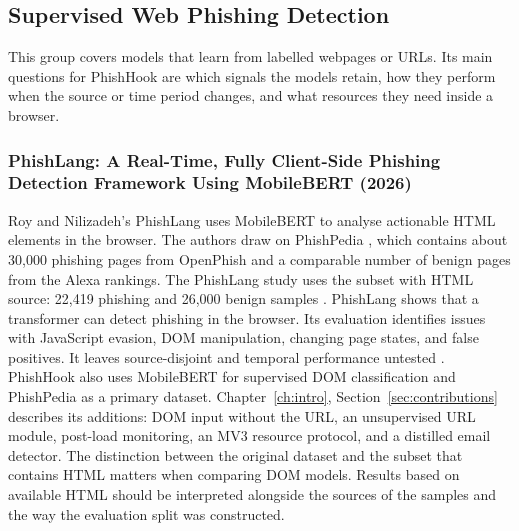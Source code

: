 \documentclass{FastFyp}
\begin{document}
\subsection{Supervised Web Phishing Detection}
This group covers models that learn from labelled webpages or URLs. Its main questions for PhishHook are which signals the models retain, how they perform when the source or time period changes, and what resources they need inside a browser.

\subsubsection{PhishLang: A Real-Time, Fully Client-Side Phishing Detection Framework Using MobileBERT (2026)}
Roy and Nilizadeh's PhishLang uses MobileBERT to analyse actionable HTML elements in the browser. The authors draw on PhishPedia \cite{phishpedia2021}, which contains about 30,000 phishing pages from OpenPhish and a comparable number of benign pages from the Alexa rankings. The PhishLang study uses the subset with HTML source: 22,419 phishing and 26,000 benign samples \cite{phishlang2026}. PhishLang shows that a transformer can detect phishing in the browser. Its evaluation identifies issues with JavaScript evasion, DOM manipulation, changing page states, and false positives. It leaves source-disjoint and temporal performance untested \cite{phishlang2026}. PhishHook also uses MobileBERT for supervised DOM classification and PhishPedia as a primary dataset. Chapter~\ref{ch:intro}, Section~\ref{sec:contributions} describes its additions: DOM input without the URL, an unsupervised URL module, post-load monitoring, an MV3 resource protocol, and a distilled email detector. The distinction between the original dataset and the subset that contains HTML matters when comparing DOM models. Results based on available HTML should be interpreted alongside the sources of the samples and the way the evaluation split was constructed.
\end{document}
